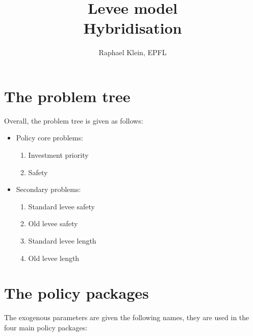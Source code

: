 \documentclass[12pt]{article}
\title{Levee model \\ Hybridisation}
\author{Raphael Klein, EPFL}
\begin{document}
\maketitle


\section{The problem tree}
\label{sec:interfaceProblemTree}

Overall, the problem tree is given as follows:

\begin{itemize}

\item Policy core problems:
	\begin{enumerate}
	
	\item Investment priority  
	
	\item Safety
	
	\end{enumerate}
	
\item Secondary problems:
	\begin{enumerate}
	
	\item Standard levee safety
	
	\item Old levee safety
	
	\item Standard levee length
	
	\item Old levee length
		
	\end{enumerate}

\end{itemize}

\section{The policy packages}
\label{sec:interfaceInstruments}

The exogenous parameters are given the following names, they are used in the four main policy packages:
\end{document}
